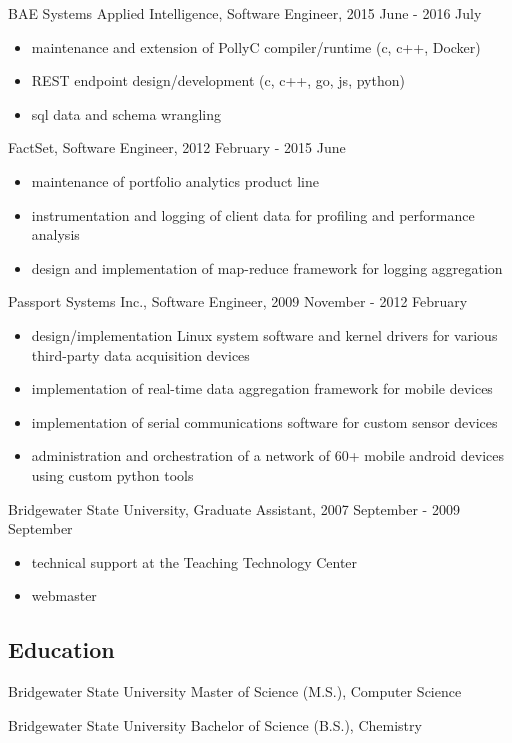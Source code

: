\documentclass[letterpaper,11pt]{article}
\begin{document}
BAE Systems Applied Intelligence, Software Engineer, 2015 June - 2016 July

\begin{itemize}
\item maintenance and extension of PollyC compiler/runtime (c, c++, Docker)
\item REST endpoint design/development (c, c++, go, js, python)
\item sql data and schema wrangling
\end{itemize}

FactSet, Software Engineer, 2012 February - 2015 June

\begin{itemize}
\item maintenance of portfolio analytics product line
\item instrumentation and logging of client data for profiling and performance analysis
\item design and implementation of map-reduce framework for logging aggregation
\end{itemize}

Passport Systems Inc., Software Engineer, 2009 November - 2012 February

\begin{itemize}
\item design/implementation Linux system software and kernel drivers for various
third-party data acquisition devices
\item implementation of real-time data aggregation framework for mobile devices
\item implementation of serial communications software for custom sensor devices
\item administration and orchestration of a network of 60+ mobile android devices using custom python tools
\end{itemize}

Bridgewater State University, Graduate Assistant, 2007 September - 2009 September

\begin{itemize}
\item technical support at the Teaching Technology Center
\item webmaster
\end{itemize}

\subsection*{Education}

Bridgewater State University
Master of Science (M.S.), Computer Science

Bridgewater State University
Bachelor of Science (B.S.), Chemistry
\end{document}

